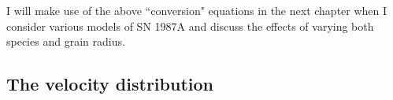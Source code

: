 
I will make use of the above ``conversion" equations in the next chapter when I consider various models of SN 1987A and discuss the effects of varying both species and grain radius.

%
%
%

\subsection{The velocity distribution}

